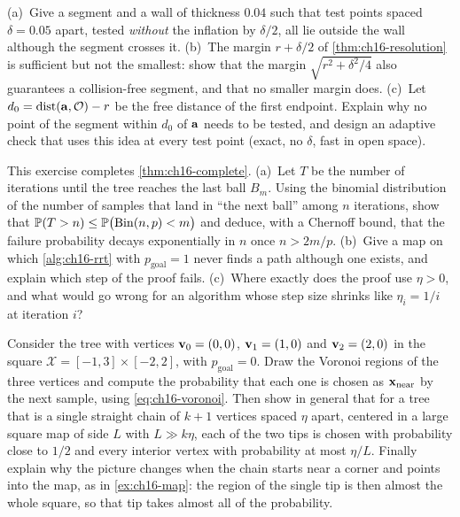 \begin{exercise}[\difficulty{2}]
\label{exr:ch16-resolution}
(a)~Give a segment and a wall of thickness $0.04$ such that test points spaced
$\delta=0.05$ apart, tested \emph{without} the inflation by $\delta/2$, all
lie outside the wall although the segment crosses it. (b)~The margin
$r+\delta/2$ of \cref{thm:ch16-resolution} is sufficient but not the
smallest: show that the margin $\sqrt{r^{2}+\delta^{2}/4}$ also guarantees
a collision-free segment, and that no smaller margin does.
(c)~Let $d_0=\operatorname{dist}(\mathbf{a},\mathcal{O})-r$ be the free distance of the first
endpoint. Explain why no point of the segment within $d_0$ of $\mathbf{a}$ needs to
be tested, and design an adaptive check that uses this idea at every test
point (exact, no $\delta$, fast in open space).
\end{exercise}

\begin{exercise}[\difficulty{2}]
\label{exr:ch16-completeness}
This exercise completes \cref{thm:ch16-complete}. (a)~Let $T$ be the number
of iterations until the tree reaches the last ball $B_m$. Using the
binomial distribution of the number of samples that land in ``the next
ball'' among $n$ iterations, show that
$\mathbb{P}(T>n)\le\mathbb{P}\bigl(\mathrm{Bin}(n,p)<m\bigr)$ and deduce, with a
Chernoff bound, that the failure probability decays exponentially in $n$
once $n>2m/p$. (b)~Give a map on which \cref{alg:ch16-rrt} with
$p_{\mathrm{goal}}=1$ never finds a path although one exists, and explain
which step of the proof fails. (c)~Where exactly does the proof use
$\eta>0$, and what would go wrong for an algorithm whose step size shrinks
like $\eta_i=1/i$ at iteration $i$?
\end{exercise}

\begin{exercise}[\difficulty{2}]
\label{exr:ch16-voronoi}
Consider the tree with vertices $\mathbf{v}_0=(0,0)$, $\mathbf{v}_1=(1,0)$ and $\mathbf{v}_2=(2,0)$ in
the square $\mathcal{X}=[-1,3]\times[-2,2]$, with $p_{\mathrm{goal}}=0$.
Draw the Voronoi regions of the three vertices and compute the probability
that each one is chosen as $\mathbf{x}_{\mathrm{near}}$ by the next sample, using
\cref{eq:ch16-voronoi}. Then show in general that for a tree that is a single
straight chain of $k+1$ vertices spaced $\eta$ apart, centered in a large
square map of side $L$ with $L\gg k\eta$, each of the two tips is chosen with
probability close to $1/2$ and every interior vertex with probability at most
$\eta/L$. Finally explain why the picture changes when the chain starts near
a corner and points into the map, as in \cref{ex:ch16-map}: the region of the
single tip is then almost the whole square, so that tip takes almost all of
the probability.
\end{exercise}

